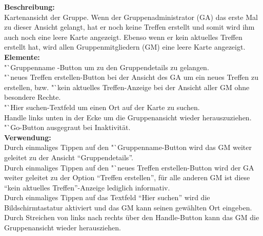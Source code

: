 \textbf{Beschreibung:}\\
Kartenansicht der Gruppe. Wenn der Gruppenadministrator (GA) das erste Mal zu dieser Ansicht gelangt, hat er noch keine Treffen erstellt und somit wird ihm auch noch eine leere Karte angezeigt. Ebenso wenn er kein aktuelles Treffen erstellt hat, wird allen Gruppenmitgliedern (GM) eine leere Karte angezeigt.\\
\textbf{Elemente:}\\
"`Gruppenname\grqq
-Button um zu den Gruppendetails zu gelangen.\\
"`neues Treffen erstellen\grqq-Button bei der Ansicht des GA um ein neues Treffen zu erstellen, bzw. "`kein aktuelles Treffen\grqq-Anzeige bei der Ansicht aller GM ohne besondere Rechte.\\
"`Hier suchen\grqq-Textfeld um einen Ort auf der Karte zu suchen.\\
Handle links unten in der Ecke um die Gruppenansicht wieder herauszuziehen.\\
"`Go\grqq-Button ausgegraut bei Inaktivität.\\
\textbf{Verwendung:}\\
Durch einmaliges Tippen auf den "`Gruppenname\grqq-Button wird das GM weiter geleitet zu der Ansicht "`Gruppendetails"'.\\
Durch einmaliges Tippen auf den "`neues Treffen erstellen\grqq-Button wird der GA weiter geleitet zu der Option "`Treffen erstellen"', für alle anderen GM ist diese "`kein aktuelles Treffen"'-Anzeige lediglich informativ.\\
Durch einmaliges Tippen auf das Textfeld "`Hier suchen"' wird die Bildschirmtastatur aktiviert und das GM kann seinen gewählten Ort eingeben.\\
Durch Streichen von links nach rechts über den Handle-Button kann das GM die Gruppenansicht wieder herausziehen.
\clearpage
\newpage

